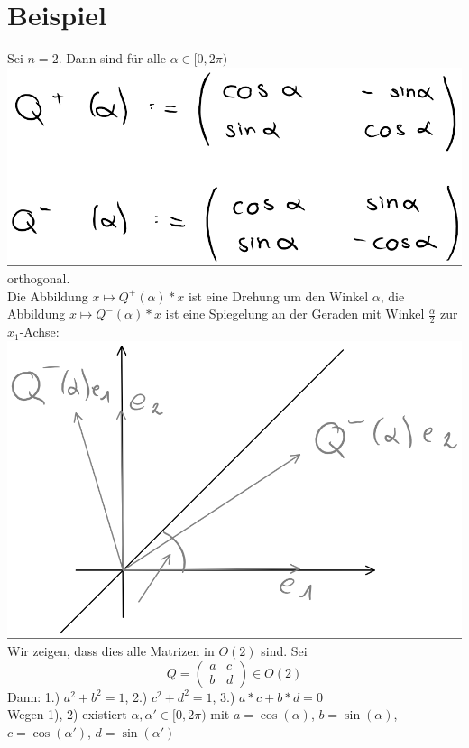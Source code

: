 \documentclass{scrbook}
\begin{document}
\section{Beispiel}
Sei $n=2$. Dann sind für alle $\alpha \in [0,2\pi)$
\\\includegraphics{Beispiel_12_4_1.png}
\\
orthogonal.\\
Die Abbildung $x \mapsto Q^+ (\alpha) *x$ ist eine Drehung um den Winkel $\alpha$, die Abbildung $x \mapsto Q^-(\alpha) *x$ ist eine Spiegelung an der Geraden mit Winkel $\frac{\alpha}{2}$ zur $x_1$-Achse:
\\\includegraphics{Beispiel_12_4_2.png}
\\
Wir zeigen, dass dies alle Matrizen in $O(2)$ sind. Sei
\[Q=\left(
\begin{array}{cc}
a&c\\
b&d
\end{array}
\right) \in O(2)\]
Dann: 1.) $a^2+b^2 = 1$, 2.) $c^2+d^2 = 1$, 3.) $a*c+ b*d=0$\\
Wegen 1), 2) existiert $\alpha, \alpha' \in [0,2\pi)$ mit $a = \cos(\alpha)$, $b=\sin(\alpha)$, $c = \cos(\alpha')$, $d = \sin(\alpha')$\\
\end{document}
